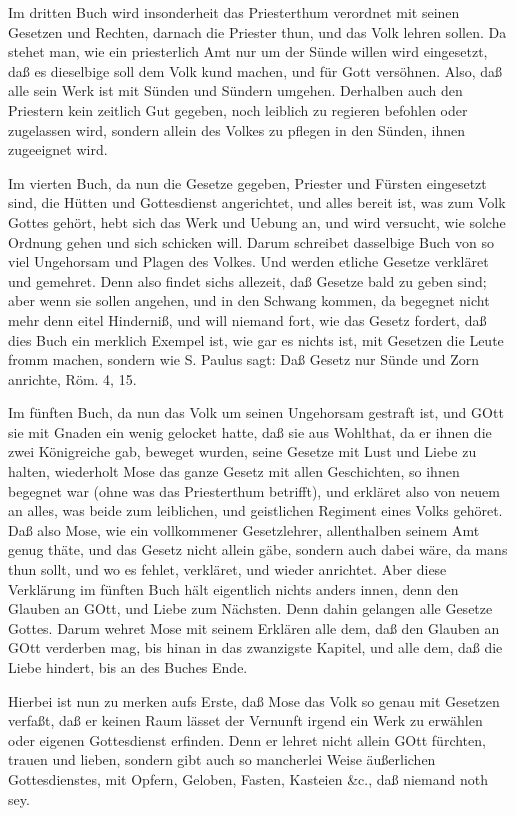 Im dritten Buch wird insonderheit das Priesterthum verordnet mit seinen Gesetzen und Rechten, darnach die Priester thun, und das Volk lehren sollen. Da stehet man, wie ein priesterlich Amt nur um der Sünde willen wird eingesetzt, daß es dieselbige soll dem Volk kund machen, und für Gott versöhnen. Also, daß alle sein Werk ist mit Sünden und Sündern umgehen. Derhalben auch den Priestern kein zeitlich Gut gegeben, noch leiblich zu regieren befohlen oder zugelassen wird, sondern allein des Volkes zu pflegen in den Sünden, ihnen zugeeignet wird.

Im vierten Buch, da nun die Gesetze gegeben, Priester und Fürsten eingesetzt sind, die Hütten und Gottesdienst angerichtet, und alles bereit ist, was zum Volk Gottes gehört, hebt sich das Werk und Uebung an, und wird versucht, wie solche Ordnung gehen und sich schicken will. Darum schreibet dasselbige Buch von so viel Ungehorsam und Plagen des Volkes. Und werden etliche Gesetze verkläret und gemehret. Denn also findet sichs allezeit, daß Gesetze bald zu geben sind; aber wenn sie sollen angehen, und in den Schwang kommen, da begegnet nicht mehr denn eitel Hinderniß, und will niemand fort, wie das Gesetz fordert, daß dies Buch ein merklich Exempel ist, wie gar es nichts ist, mit Gesetzen die Leute fromm machen, sondern wie S. Paulus sagt: Daß Gesetz nur Sünde und Zorn anrichte, Röm. 4, 15.

Im fünften Buch, da nun das Volk um seinen Ungehorsam gestraft ist, und GOtt sie mit Gnaden ein wenig gelocket hatte, daß sie aus Wohlthat, da er ihnen die zwei Königreiche gab, beweget wurden, seine Gesetze mit Lust und Liebe zu halten, wiederholt Mose das ganze Gesetz mit allen Geschichten, so ihnen begegnet war (ohne was das Priesterthum betrifft), und erkläret also von neuem an alles, was beide zum leiblichen, und geistlichen Regiment eines Volks gehöret. Daß also Mose, wie ein vollkommener Gesetzlehrer, allenthalben seinem Amt genug thäte, und das Gesetz nicht allein gäbe, sondern auch dabei wäre, da mans thun sollt, und wo es fehlet, verkläret, und wieder anrichtet. Aber diese Verklärung im fünften Buch hält eigentlich nichts anders innen, denn den Glauben an GOtt, und Liebe zum Nächsten. Denn dahin gelangen alle Gesetze Gottes. Darum wehret Mose mit seinem Erklären alle dem, daß den Glauben an GOtt verderben mag, bis hinan in das zwanzigste Kapitel, und alle dem, daß die Liebe hindert, bis an des Buches Ende.

Hierbei ist nun zu merken aufs Erste, daß Mose das Volk so genau mit Gesetzen verfaßt, daß er keinen Raum lässet der Vernunft irgend ein Werk zu erwählen oder eigenen Gottesdienst erfinden. Denn er lehret nicht allein GOtt fürchten, trauen und lieben, sondern gibt auch so mancherlei Weise äußerlichen Gottesdienstes, mit Opfern, Geloben, Fasten, Kasteien \&c., daß niemand noth sey.

